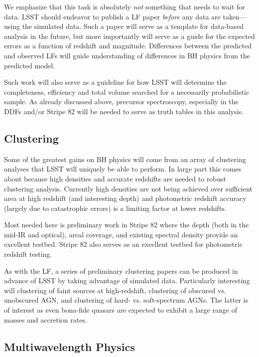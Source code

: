 We emphasize that this task is absolutely {\em not} something that needs to wait for data.  LSST should endeavor to publish a LF paper {\em before} any data are taken---using the simulated data.  Such a paper will serve as a template for data-based analysis in the future, but more importantly will serve as a guide for the expected errors as a function of redshift and magnitude.  Differences between the predicted and observed LFs will guide understanding of differences in BH physics from the predicted model.

Such work will also serve as a guideline for how LSST will determine the completeness, efficiency and total volume searched for a necessarily probabilistic sample.  As already discussed above, precursor spectroscopy, especially in the DDFs and/or Stripe 82 will be needed to serve as truth tables in this analysis.

\subsection{Clustering}

Some of the greatest gains on BH physics will come from an array of clustering analyses that LSST will uniquely be able to perform.  In large part this comes about because high densities and accurate redshifts are needed to robust clustering analysis.  Currently high densities are not being achieved over sufficient area at high redshift (and interesting depth) and photometric redshift accuracy (largely due to catastrophic errors) is a limiting factor at lower redshifts.  

Most needed here is preliminary work in Stripe 82 where the depth (both in the mid-IR and optical), areal coverage, and existing spectral density provide an excellent testbed.  Stripe 82 also serves as an excellent testbed for photometric redshift testing.

As with the LF, a series of preliminary clustering papers can be produced in advance of LSST by taking advantage of simulated data.  Particularly interesting will clustering of faint sources at high-redshift, clustering of obscured vs. unobscured AGN, and clustering of hard- vs. soft-spectrum AGNs.  The latter is of interest as even bona-fide quasars are expected to exhibit a large range of masses and accretion rates.


\subsection{Multiwavelength Physics}

